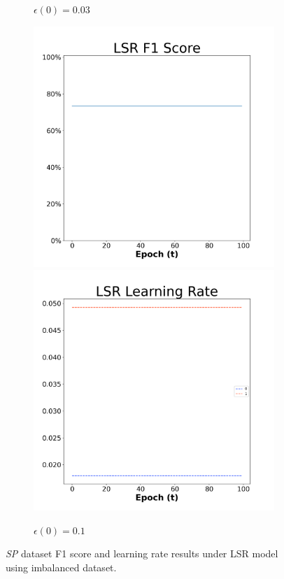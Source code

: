 \begin{figure}[H]
\begin{subfigure}{0.3\textwidth}
  \caption{$\epsilon(0)=0.03$}
\end{subfigure}\hfil %
\begin{subfigure}{0.3\textwidth}
  \includegraphics[width=\linewidth]{images/exper2/SP/LSR_0.1_f1.png}
  \includegraphics[width=\linewidth]{images/exper2/SP/LSR_0.1_lr.png}
  \caption{$\epsilon(0)=0.1$}
\end{subfigure}

\caption{\textit{SP} dataset F1 score and learning rate results under LSR model using imbalanced dataset.}
\end{figure}

